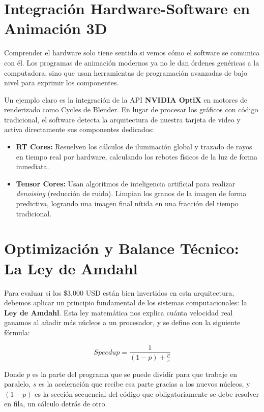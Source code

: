 \documentclass[14pt,a4paper]{extarticle}
\begin{document}
\section*{\centering Integración Hardware-Software en Animación 3D}

Comprender el hardware solo tiene sentido si vemos cómo el software se comunica con él. Los programas de animación modernos ya no le dan órdenes genéricas a la computadora, sino que usan herramientas de programación avanzadas de bajo nivel para exprimir los componentes.

Un ejemplo claro es la integración de la API \textbf{NVIDIA OptiX} en motores de renderizado como Cycles de Blender. En lugar de procesar los gráficos con código tradicional, el software detecta la arquitectura de nuestra tarjeta de video y activa directamente sus componentes dedicados:

\begin{itemize}
    \item \textbf{RT Cores:} Resuelven los cálculos de iluminación global y trazado de rayos en tiempo real por hardware, calculando los rebotes físicos de la luz de forma inmediata.
    \item \textbf{Tensor Cores:} Usan algoritmos de inteligencia artificial para realizar \textit{denoising} (reducción de ruido). Limpian los granos de la imagen de forma predictiva, logrando una imagen final nítida en una fracción del tiempo tradicional.
\end{itemize}

\section*{\centering Optimización y Balance Técnico: La Ley de Amdahl}

Para evaluar si los \$3,000 USD están bien invertidos en esta arquitectura, debemos aplicar un principio fundamental de los sistemas computacionales: la \textbf{Ley de Amdahl}. Esta ley matemática nos explica cuánta velocidad real ganamos al añadir más núcleos a un procesador, y se define con la siguiente fórmula:

$$Speedup = \frac{1}{(1 - p) + \frac{p}{s}}$$

Donde $p$ es la parte del programa que se puede dividir para que trabaje en paralelo, $s$ es la aceleración que recibe esa parte gracias a los nuevos núcleos, y $(1 - p)$ es la sección secuencial del código que obligatoriamente se debe resolver en fila, un cálculo detrás de otro.
\end{document}
